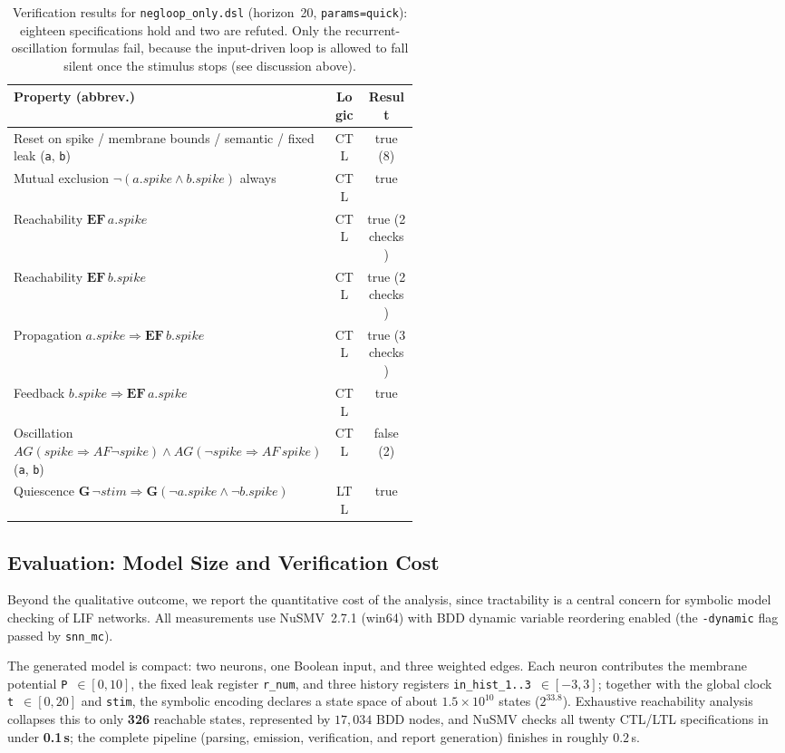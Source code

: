 \documentclass[
]{ceurart}
\begin{document}
\begin{table}
\centering
\caption{Verification results for \texttt{negloop\_only.dsl} (horizon~20, \texttt{params=quick}): eighteen specifications hold and two are refuted. Only the recurrent-oscillation formulas fail, because the input-driven loop is allowed to fall silent once the stimulus stops (see discussion above).}
\label{tab:case-results}
\small
\begin{tabular}{@{}p{0.52\linewidth}cc@{}}
\toprule
\textbf{Property (abbrev.)} & \textbf{Logic} & \textbf{Result} \\
\midrule
Reset on spike / membrane bounds / semantic / fixed leak (\texttt{a}, \texttt{b}) & CTL & true (8) \\
Mutual exclusion $\neg(a.\mathit{spike} \land b.\mathit{spike})$ always & CTL & true \\
Reachability $\mathbf{EF}\, a.\mathit{spike}$ & CTL & true (2 checks) \\
Reachability $\mathbf{EF}\, b.\mathit{spike}$ & CTL & true (2 checks) \\
Propagation $a.\mathit{spike} \Rightarrow \mathbf{EF}\, b.\mathit{spike}$ & CTL & true (3 checks) \\
Feedback $b.\mathit{spike} \Rightarrow \mathbf{EF}\, a.\mathit{spike}$ & CTL & true \\
Oscillation $AG(spike \Rightarrow AF \lnot spike) \land AG(\lnot spike \Rightarrow AF\, spike)$ (\texttt{a}, \texttt{b}) & CTL & false (2) \\
Quiescence $\mathbf{G}\,\lnot stim \Rightarrow \mathbf{G}(\lnot a.\mathit{spike} \land \lnot b.\mathit{spike})$ & LTL & true \\
\bottomrule
\end{tabular}
\end{table}

\subsection{Evaluation: Model Size and Verification Cost}
\label{subsec:case-eval}

Beyond the qualitative outcome, we report the quantitative cost of the analysis, since
tractability is a central concern for symbolic model checking of LIF networks. All
measurements use NuSMV~2.7.1 (win64) with BDD dynamic variable reordering enabled (the
\texttt{-dynamic} flag passed by \texttt{snn\_mc}).

The generated model is compact: two neurons, one Boolean input, and three weighted edges.
Each neuron contributes the membrane potential \texttt{P}~$\in[0,10]$, the fixed leak
register \texttt{r\_num}, and three history registers \texttt{in\_hist\_1..3}~$\in[-3,3]$;
together with the global clock \texttt{t}~$\in[0,20]$ and \texttt{stim}, the symbolic
encoding declares a state space of about $1.5\times 10^{10}$ states ($2^{33.8}$).
Exhaustive reachability analysis collapses this to only \textbf{326} reachable states,
represented by $17{,}034$ BDD nodes, and NuSMV checks all twenty CTL/LTL specifications in
under \textbf{0.1\,s}; the complete pipeline (parsing, emission, verification, and report
generation) finishes in roughly $0.2$\,s.
\end{document}
